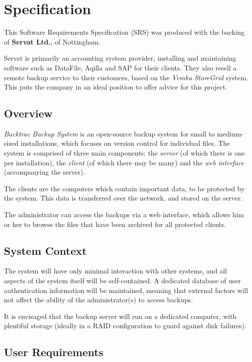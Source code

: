 \chapter{Specification}

This Software Requirements Specification (SRS) was produced with the backing of
\textbf{Servat Ltd.}, of Nottingham.

Servat is primarily an accounting system provider, installing and maintaining
software such as DataFile, Aqilla and SAP for their clients. They also resell
a remote backup service to their customers, based on the \emph{Vembu StoreGrid}
system. This puts the company in an ideal position to offer advice for this
project.

\section{Overview}

\emph{Backtrac Backup System} is an open-source backup system for small to
medium-sized installations, which focuses on version control for individual
files. The system is comprised of three main components: the \emph{server} (of
which there is one per installation), the \emph{client} (of which there may be
many) and the \emph{web interface} (accompanying the server).

The clients are the computers which contain important data, to be protected by
the system. This data is transferred over the network, and stored on the
server.

The administrator can access the backups via a web interface, which allows him
or her to browse the files that have been archived for all protected clients.

\section{System Context}

The system will have only minimal interaction with other systems, and all
aspects of the system itself will be self-contained. A dedicated database of
user authentication information will be maintained, meaning that external
factors will not affect the ability of the administrator(s) to access backups.

It is envisaged that the backup server will run on a dedicated computer, with
plentiful storage (ideally in a RAID configuration to guard against disk
failures).

\section{User Requirements}

